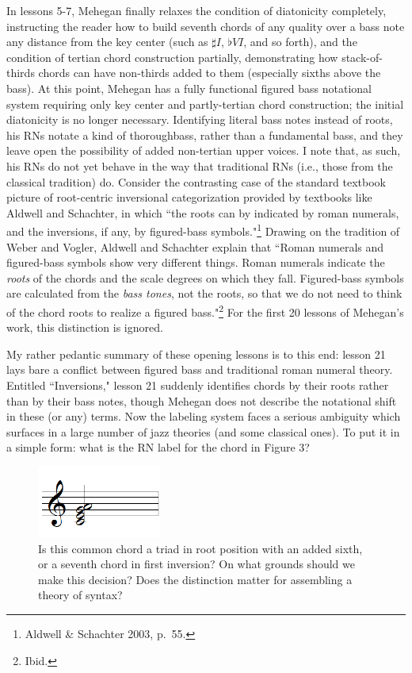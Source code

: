 In lessons 5-7, Mehegan finally relaxes the condition of diatonicity completely, instructing the reader how to build seventh chords of any quality over a bass note any distance from the key center (such as $\sharp I$, $\flat VI$, and so forth), and the condition of tertian chord construction partially, demonstrating how stack-of-thirds chords can have non-thirds added to them (especially sixths above the bass).  At this point, Mehegan has a fully functional figured bass notational system requiring only key center and partly-tertian chord construction; the initial diatonicity is no longer necessary.  Identifying literal bass notes instead of roots, his RNs notate a kind of thoroughbass, rather than a fundamental bass, and they leave open the possibility of added non-tertian upper voices.  I note that, as such, his RNs do not yet behave in the way that traditional RNs (i.e., those from the classical tradition) do.  Consider the contrasting case of the standard textbook picture of root-centric inversional categorization provided by textbooks like Aldwell and Schachter, in which ``the roots can by indicated by roman numerals, and the inversions, if any, by figured-bass symbols."\footnote{Aldwell \& Schachter 2003, p.\ 55.}  Drawing on the tradition of Weber and Vogler, Aldwell and Schachter explain that ``Roman numerals and figured-bass symbols show very different things.  Roman numerals indicate the \emph{roots} of the chords and the scale degrees on which they fall.  Figured-bass symbols are calculated from the \emph{bass tones}, not the roots, so that we do not need to think of the chord roots to realize a figured bass."\footnote{Ibid.}  For the first 20 lessons of Mehegan's work, this distinction is ignored.

My rather pedantic summary of these opening lessons is to this end: lesson 21 lays bare a conflict between figured bass and traditional roman numeral theory.  Entitled ``Inversions," lesson 21 suddenly identifies chords by their roots rather than by their bass notes, though Mehegan does not describe the notational shift in these (or any) terms.  Now the labeling system faces a serious ambiguity which surfaces in a large number of jazz theories (and some classical ones).  To put it in a simple form: what is the RN label for the chord in Figure 3?
\begin{figure}
	\centering
	\caption{Is this common chord a triad in root position with an added sixth, or a seventh chord in first inversion?  On what grounds should we make this decision?  Does the distinction matter for assembling a theory of syntax?}
	\includegraphics[width=1.6in]{diss_prospectus_cega.png}
\end{figure}

